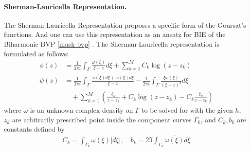 \documentclass[10pt,twocolumn]{article}
\begin{document}
\paragraph*{Sherman-Lauricella Representation.} 
The Sherman-Lauricella Representation proposes a specific form of the Goursat's functions. And one can use this representation as an ansatz for BIE of the Biharmonic BVP \eqref{musk-bvp}
\cite{greengardIntegralEquationMethods1996}. 
The Sherman-Lauricella representation is formulated as follows:
\begin{align}
  \phi(z) &=
    \frac {1}{2\pi i} \int_\Gamma \frac{\omega(\xi)}{\xi - z} d\xi  
    + \sum_{k=1}^M C_k \log (z-z_k) \label{sl-phi}
    \\
  \psi(z) &=
    \frac {1}{2\pi i} \int_\Gamma \frac{\overline{\omega(\xi)}d\xi +  \omega(\xi)\overline{d\xi}}{\xi - z}  
    - \frac {1}{2\pi i} \int_\Gamma \frac{\overline{\xi} \omega(\xi)}{(\xi - z)^2} d\xi  \label{sl-psi}
    \\
    & \quad + \sum _{k=1}^M 
    \left( \frac{b_k}{z-z_k} + \overline C_k \log (z-z_k) -  C_k \frac{\overline z_k}{z-z_k} \right) \nonumber 
\end{align}
where $\omega$ is an unknown complex density on $\Gamma$ to be solved 
for with the given $h$, 
$z_k$ are arbitrarily prescribed point inside the component curves $\Gamma_k$, 
and $C_k, b_k$ are constants defined by 
\begin{align}
  C_k = \int_{\Gamma_k} \omega(\xi) |d\xi|, \quad b_k = 2 \Im\int_{\Gamma_k} \overline{\omega(\xi)} {d\xi}
\end{align}
\end{document}
